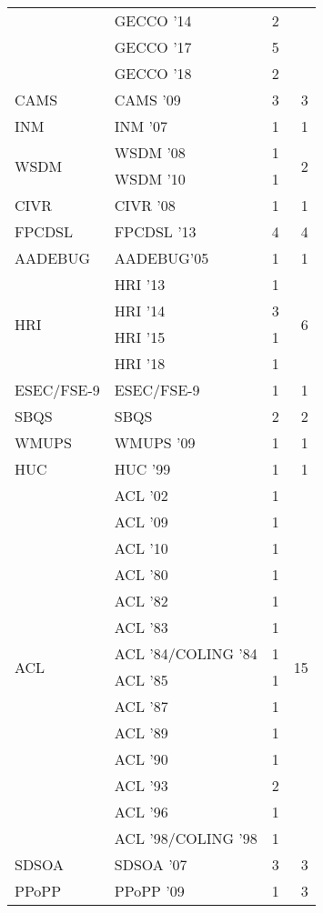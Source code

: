 \begin{table*}[t]
\begin{tabular}{llrr}
& GECCO '14 & 2 &\\
& GECCO '17 & 5 &\\
& GECCO '18 & 2 &\\
\multirow{1}{*}{CAMS } & CAMS '09 & 3 & \multirow{1}{*}{3}\\
\multirow{1}{*}{INM } & INM '07 & 1 & \multirow{1}{*}{1}\\
\multirow{2}{*}{WSDM } & WSDM '08 & 1 & \multirow{2}{*}{2}\\
& WSDM '10 & 1 &\\
\multirow{1}{*}{CIVR } & CIVR '08 & 1 & \multirow{1}{*}{1}\\
\multirow{1}{*}{FPCDSL } & FPCDSL '13 & 4 & \multirow{1}{*}{4}\\
\multirow{1}{*}{AADEBUG} & AADEBUG'05 & 1 & \multirow{1}{*}{1}\\
\multirow{4}{*}{HRI } & HRI '13 & 1 & \multirow{4}{*}{6}\\
& HRI '14 & 3 &\\
& HRI '15 & 1 &\\
& HRI '18 & 1 &\\
\multirow{1}{*}{ESEC/FSE-9} & ESEC/FSE-9 & 1 & \multirow{1}{*}{1}\\
\multirow{1}{*}{SBQS} & SBQS & 2 & \multirow{1}{*}{2}\\
\multirow{1}{*}{WMUPS } & WMUPS '09 & 1 & \multirow{1}{*}{1}\\
\multirow{1}{*}{HUC } & HUC '99 & 1 & \multirow{1}{*}{1}\\
\multirow{14}{*}{ACL } & ACL '02 & 1 & \multirow{14}{*}{15}\\
& ACL '09 & 1 &\\
& ACL '10 & 1 &\\
& ACL '80 & 1 &\\
& ACL '82 & 1 &\\
& ACL '83 & 1 &\\
& ACL '84/COLING '84 & 1 &\\
& ACL '85 & 1 &\\
& ACL '87 & 1 &\\
& ACL '89 & 1 &\\
& ACL '90 & 1 &\\
& ACL '93 & 2 &\\
& ACL '96 & 1 &\\
& ACL '98/COLING '98 & 1 &\\
\multirow{1}{*}{SDSOA } & SDSOA '07 & 3 & \multirow{1}{*}{3}\\
\multirow{3}{*}{PPoPP } & PPoPP '09 & 1 & \multirow{3}{*}{3}\\

\end{tabular}
\end{table*}
